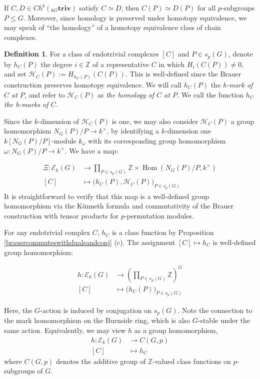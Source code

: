 \documentclass[10pt,letterpaper, boxed, cm]{amsart}
\newcommand{\Z}{\mathbb{Z}}
\newcommand{\Hom}{\operatorname{Hom}}
\newcommand{\calE}{\mathcal{E}}
\newcommand{\calH}{\mathcal{H}}
\theoremstyle{remark}
\theoremstyle{definition}
\newtheorem{definition}[theorem]{Definition}
\begin{document}
	If $C,D \in Ch^b({}_{kG}\textbf{triv})$ satisfy $C \simeq D$, then $C(P) \simeq D(P)$ for all $p$-subgroups $P \leq G$. Moreover, since homology is preserved under homotopy equivalence, we may speak of ``the homology'' of a homotopy equivalence class of chain complexes.

	\begin{definition} \label{hmarkhom}
		For a class of endotrivial complexes $[C]$ and $P \in s_p(G)$, denote by $h_C(P)$ the degree $i\in \Z$ of a representative $C$ in which $H_i(C(P)) \neq 0$, and set $\calH_C(P):= H_{h_C(P)}(C(P))$. This is well-defined since the Brauer construction preserves homotopy equivalence. We will call $h_C(P)$ the \textit{h-mark of $C$ at $P$}, and refer to $\calH_C(P)$ as \textit{the homology of $C$ at $P$.} We call the function $h_C$ \textit{the h-marks of $C$.}

        Since the $k$-dimension of $\calH_C(P)$ is one, we may also consider $\calH_C(P)$ a group homomorphism $N_G(P)/P \to k^\times$, by identifying a $k$-dimension one $k[N_G(P)/P]$-module $k_\omega$ with its corresponding group homomorphism $\omega: N_G(P)/P\to k^\times$. We have a map:

		\begin{align*}
		\Xi: \calE_k(G) &\to \prod_{P \in s_p(G)} \Z \times \Hom(N_G(P)/P, k^\times)\\
		[C] &\mapsto \big(h_C(P), \calH_C(P)\big)_{P \in s_p(G)}
		\end{align*}
		It is straightforward to verify that this map is a well-defined group homomorphism via the K{\"u}nneth formula and commutativity of the Brauer construction with tensor products for $p$-permutation modules.

        For any endotrivial complex $C$, $h_C$ is a class function by Proposition \ref{brauercommuteswithdualsandconj} (c). The assignment $[C] \mapsto h_C$ is well-defined group homomorphism:

		\begin{align*}
		h: \calE_k(G) &\to \left(\prod_{P \in s_p(G)} \Z \right)^G\\
		[C] &\mapsto \big(h_C(P)\big)_{P \in s_p(G)}
		\end{align*}

        Here, the $G$-action is induced by conjugation on $s_p(G)$. Note the connection to the mark homomorphism on the Burnside ring, which is also $G$-stable under the same action. Equivalently, we may view $h$ as a group homomorphism,
        \begin{align*}
            h: \calE_k(G) &\to C(G,p)\\
            [C] &\mapsto h_C
        \end{align*}
        where $C(G,p)$ denotes the additive group of $\Z$-valued class functions on $p$-subgroups of $G$.
	\end{definition}
\end{document}
